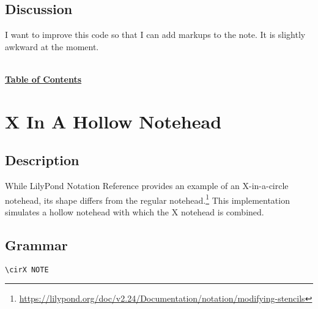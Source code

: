 \documentclass[11pt, oneside]{book}   	%
\begin{document}
\subsection{Discussion}
I want to improve this code so that I can add markups to the note. It is slightly awkward at the moment.


\hyperref[sec:toc]{\\ \textbf{Table of Contents}}
\clearpage



\section {X In A Hollow Notehead}
\hfill

\subsection{Description}
While LilyPond Notation Reference provides an example of an X-in-a-circle notehead, its shape differs from the regular notehead.\footnote{\url{https://lilypond.org/doc/v2.24/Documentation/notation/modifying-stencils}} This implementation simulates a hollow notehead with which the X notehead is combined.

\subsection{Grammar}
\begin{verbatim}
\cirX NOTE
\end{verbatim}
\end{document}
